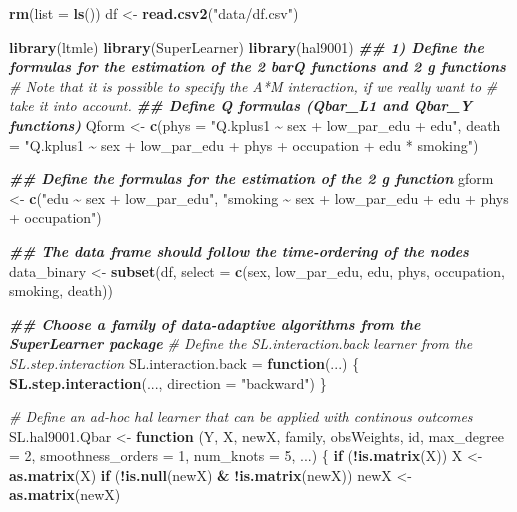 \documentclass[
]{book}
\newenvironment{Shaded}{\begin{snugshade}}{\end{snugshade}}
\newcommand{\AttributeTok}[1]{\textcolor[rgb]{0.13,0.29,0.53}{#1}}
\newcommand{\CommentTok}[1]{\textcolor[rgb]{0.56,0.35,0.01}{\textit{#1}}}
\newcommand{\ControlFlowTok}[1]{\textcolor[rgb]{0.13,0.29,0.53}{\textbf{#1}}}
\newcommand{\DecValTok}[1]{\textcolor[rgb]{0.00,0.00,0.81}{#1}}
\newcommand{\DocumentationTok}[1]{\textcolor[rgb]{0.56,0.35,0.01}{\textbf{\textit{#1}}}}
\newcommand{\FunctionTok}[1]{\textcolor[rgb]{0.13,0.29,0.53}{\textbf{#1}}}
\newcommand{\NormalTok}[1]{#1}
\newcommand{\OtherTok}[1]{\textcolor[rgb]{0.56,0.35,0.01}{#1}}
\newcommand{\SpecialCharTok}[1]{\textcolor[rgb]{0.81,0.36,0.00}{\textbf{#1}}}
\newcommand{\StringTok}[1]{\textcolor[rgb]{0.31,0.60,0.02}{#1}}
\begin{document}
\begin{Shaded}
\begin{Highlighting}[]
\FunctionTok{rm}\NormalTok{(}\AttributeTok{list =} \FunctionTok{ls}\NormalTok{())}
\NormalTok{df }\OtherTok{\textless{}{-}} \FunctionTok{read.csv2}\NormalTok{(}\StringTok{"data/df.csv"}\NormalTok{)}

\FunctionTok{library}\NormalTok{(ltmle)}
\FunctionTok{library}\NormalTok{(SuperLearner)}
\FunctionTok{library}\NormalTok{(hal9001)}
\DocumentationTok{\#\# 1) Define the formulas for the estimation of the 2 barQ functions and 2 g functions}
\CommentTok{\# Note that it is possible to specify the A*M interaction, if we really want to}
\CommentTok{\# take it into account.}
\DocumentationTok{\#\# Define Q formulas (Qbar\_L1 and Qbar\_Y functions)}
\NormalTok{Qform }\OtherTok{\textless{}{-}} \FunctionTok{c}\NormalTok{(}\AttributeTok{phys =} \StringTok{"Q.kplus1 \textasciitilde{} sex + low\_par\_edu + edu"}\NormalTok{,}
           \AttributeTok{death =} \StringTok{"Q.kplus1 \textasciitilde{} sex + low\_par\_edu + phys + occupation +}
\StringTok{                    edu * smoking"}\NormalTok{)}

\DocumentationTok{\#\# Define the formulas for the estimation of the 2 g function}
\NormalTok{gform }\OtherTok{\textless{}{-}} \FunctionTok{c}\NormalTok{(}\StringTok{"edu \textasciitilde{} sex + low\_par\_edu"}\NormalTok{,}
           \StringTok{"smoking \textasciitilde{} sex + low\_par\_edu + edu + phys + occupation"}\NormalTok{)}

\DocumentationTok{\#\# The data frame should follow the time{-}ordering of the nodes}
\NormalTok{data\_binary }\OtherTok{\textless{}{-}} \FunctionTok{subset}\NormalTok{(df, }\AttributeTok{select =} \FunctionTok{c}\NormalTok{(sex, low\_par\_edu,}
\NormalTok{                                     edu, phys, occupation,}
\NormalTok{                                     smoking, death))}

\DocumentationTok{\#\# Choose a family of data{-}adaptive algorithms from the SuperLearner package}
\CommentTok{\# Define the SL.interaction.back learner from the SL.step.interaction}
\NormalTok{SL.interaction.back }\OtherTok{=} \ControlFlowTok{function}\NormalTok{(...) \{}
  \FunctionTok{SL.step.interaction}\NormalTok{(..., }\AttributeTok{direction =} \StringTok{"backward"}\NormalTok{)}
\NormalTok{\}}

\CommentTok{\# Define an ad{-}hoc hal learner that can be applied with continous outcomes}
\NormalTok{SL.hal9001.Qbar }\OtherTok{\textless{}{-}} \ControlFlowTok{function}\NormalTok{ (Y, X, newX, family, obsWeights, id, }\AttributeTok{max\_degree =} \DecValTok{2}\NormalTok{, }
                             \AttributeTok{smoothness\_orders =} \DecValTok{1}\NormalTok{, }\AttributeTok{num\_knots =} \DecValTok{5}\NormalTok{, ...) \{}
  \ControlFlowTok{if}\NormalTok{ (}\SpecialCharTok{!}\FunctionTok{is.matrix}\NormalTok{(X)) }
\NormalTok{    X }\OtherTok{\textless{}{-}} \FunctionTok{as.matrix}\NormalTok{(X)}
  \ControlFlowTok{if}\NormalTok{ (}\SpecialCharTok{!}\FunctionTok{is.null}\NormalTok{(newX) }\SpecialCharTok{\&} \SpecialCharTok{!}\FunctionTok{is.matrix}\NormalTok{(newX)) }
\NormalTok{    newX }\OtherTok{\textless{}{-}} \FunctionTok{as.matrix}\NormalTok{(newX)}
  

\end{Highlighting}
\end{Shaded}
\end{document}
